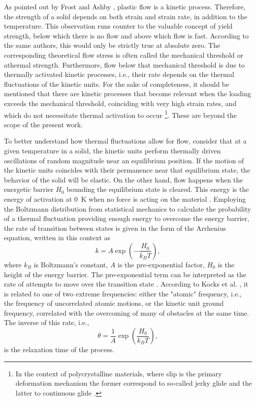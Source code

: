 As pointed out by Frost and Ashby \citep{frostDeformationmechanismMapsPlasticity1982}, plastic flow is a kinetic process.
Therefore, the strength of a solid depends on both strain and strain rate, in addition to the temperature.
This observation runs counter to the valuable concept of yield strength, below which there is no flow and above which flow is fast.
According to the same authors, this would only be strictly true at absolute zero.
The corresponding theoretical flow stress is often called the mechanical threshold or athermal strength.
Furthermore, flow below that mechanical threshold is due to thermally activated kinetic processes, i.e., their rate depends on the thermal fluctuations of the kinetic units.
For the sake of completeness, it should be mentioned that there are kinetic processes that become relevant when the loading exceeds the mechanical threshold, coinciding with very high strain rates, and which do not necessitate thermal activation to occur \citep{kocks1975thermodynamics}\footnote{In the context of polycrystalline materials, where slip is the primary deformation mechanism the former correspond to so-called jerky glide and the latter to continuous glide \citep{kocks1975thermodynamics}.}.
These are beyond the scope of the present work.

To better understand how thermal fluctuations allow for flow, consider that at a given temperature in a solid, the kinetic units perform thermally driven oscillations of random magnitude near an equilibrium position.
If the motion of the kinetic units coincides with their permanence near that equilibrium state, the behavior of the solid will be elastic.
On the other hand, flow happens when the energetic barrier $H_0$ bounding the equilibrium state is cleared.
This energy is the energy of activation at \SI{0}{\kelvin} when no force is acting on the material \citep{kocks1975thermodynamics}.
Employing the Boltzmann distribution from statistical mechanics to calculate the probability of a thermal fluctuation providing enough energy to overcome the energy barrier, the rate of transition between states is given in the form of the Arrhenius equation, written in this context as
\begin{equation}
	k = A\exp\left(-\frac{H_0}{k_BT}\right),
\end{equation}
where $k_B$ is Boltzmann's constant, $A$ is the pre-exponential factor, $H_0$ is the height of the energy barrier.
The pre-exponential term can be interpreted as the rate of attempts to move over the transition state \citep{atkins2010atkins}.
According to Kocks et al. \citep{kocks1975thermodynamics}, it is related to one of two extreme frequencies: either the "atomic" frequency, i.e., the frequency of uncorrelated atomic motions, or the kinetic unit ground frequency, correlated with the overcoming of many of obstacles at the same time.
The inverse of this rate, i.e.,
\begin{equation}
	\theta = \frac{1}{A}\exp\left(\frac{H_0}{k_B T}\right),
\end{equation}
is the relaxation time of the process.

